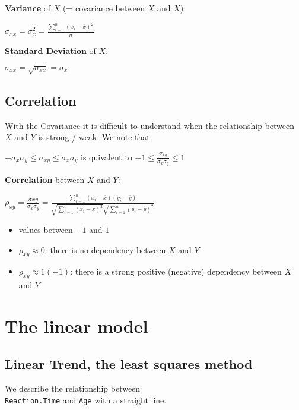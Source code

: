 \documentclass[
]{article}
\providecommand{\tightlist}{%
  \setlength{\itemsep}{0pt}\setlength{\parskip}{0pt}}
\begin{document}
\textbf{Variance} of \(X\) (= covariance between \(X\) and \(X\)):

\(\sigma_{xx}=\sigma_{x} ^ 2= \frac{\sum_{i=1} ^ n (x_i- \bar{x}) ^ 2}{n}\)

\textbf{Standard Deviation} of \(X\):

\(\sigma_{xx}=\sqrt{\sigma_{xx}}=\sigma_{x}\)

\hypertarget{correlation}{%
\subsection{Correlation}\label{correlation}}

With the Covariance it is difficult to understand when the relationship
between \(X\) and \(Y\) is strong / weak. We note that

\(- \sigma_{x} \sigma_{y} \leq \sigma_{xy} \leq \sigma_{x} \sigma_{y}\)
is quivalent to
\(-1 \leq \frac{\sigma_{xy}}{\sigma_{x} \sigma_{y}} \leq 1\)

\textbf{Correlation} between \(X\) and \(Y\):

\(\rho_{xy}=\frac{\sigma{xy}}{\sigma_{x} \sigma_{y}} = \frac{\sum_{i=1} ^ n (x_i- \bar{x}) (y_i- \bar{y})}{\sqrt{\sum_{i=1} ^ n (x_i- \bar{ x}) ^ 2} \sqrt{\sum_{i=1} ^ n (y_i- \bar{y}) ^ 2}}\)

\begin{itemize}
\tightlist
\item
  values between \(-1\) and \(1\)
\item
  \(\rho_{xy} \approx 0\): there is no dependency between \(X\) and
  \(Y\)
\item
  \(\rho_{xy} \approx 1 (-1)\): there is a strong positive (negative)
  dependency between \(X\) and \(Y\)
\end{itemize}

\hypertarget{the-linear-model}{%
\section{The linear model}\label{the-linear-model}}

\hypertarget{linear-trend-the-least-squares-method}{%
\subsection{Linear Trend, the least squares
method}\label{linear-trend-the-least-squares-method}}

We describe the relationship between\\
\texttt{Reaction.Time} and \texttt{Age} with a straight line.
\end{document}

